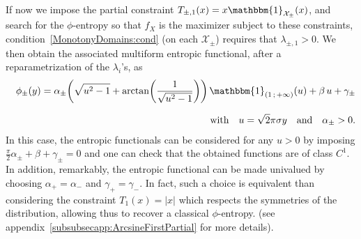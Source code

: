 \documentclass[entropy,article,submit,moreauthors,pdftex]{Definitions/mdpi}
\def\X{\mathcal{X}}%
\def\un{\mathbbm{1}}%
\begin{document}
{\begin{Example}\label{arcsineMulti:ex}
  If now  we impose the  partial constraint $T_{\pm,1}(x) =  x \un_{\X_\pm}(x)$,
  and search  for the $\phi$-entropy so  that $f_X$ is the  maximizer subject to
  these  constraints,  condition~\ref{MonotonyDomains:cond} (on  each  $\X_\pm$)
  requires that $\lambda_{\pm,1} > 0$.   We then obtain the associated multiform
  entropic functional, after a reparametrization of the $\lambda_i$'s, as
  \begin{eqnarray*}
    &&\phi_\pm(y) = \alpha_\pm \left( \sqrt{u^2 - 1} +
  \arctan\left( \frac{1}{\sqrt{u^2 - 1}}  \right) \right) \,
  \un_{( 1  \, ;  \, +\infty  )}(u) +  \beta \,  u +
  \gamma_\pm\\[2.5mm]
  &&\mbox{with} \quad u = \sqrt2 \pi \sigma y \quad \mbox{and}  \quad \alpha_\pm > 0.
  \end{eqnarray*}
  In this case,  the entropic functionals can  be considered for any $u  > 0$ by
  imposing $\frac{\pi}{2} \alpha_\pm + \beta + \gamma_\pm = 0$ and one can check
  that the obtained functions are of  class $C^1$.  In addition, remarkably, the
  entropic functional  can be made  univalued by choosing $\alpha_+  = \alpha_-$
  and  $\gamma_+  = \gamma_-$.   In  fact,  such  a  choice is  equivalent  than
  considering the constraint $T_1(x) = |x|$ which respects the symmetries of the
  distribution,  allowing  thus to  recover  a  classical $\phi$-entropy.   (see
  appendix~\ref{subsubsecapp:ArcsineFirstPartial} for more details).
\end{Example}

}
\end{document}
